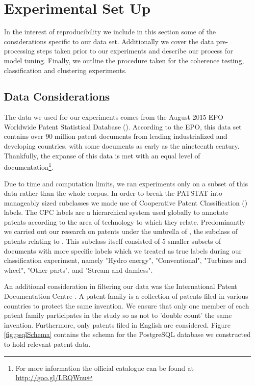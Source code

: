 
\chapter{Experimental Set Up} %

\label{Chapter3} %
In the interest of reproducibility we include in this section some of the considerations specific to our data set. Additionally we cover the data pre-processing steps taken prior to our experiments and describe our process for model tuning. Finally, we outline the procedure taken for the coherence testing, classification and clustering experiments. 

\section{Data Considerations}

The data we used for our experiments comes from the August 2015 EPO Worldwide Patent Statistical Database (). According to the EPO, this data set contains over 90 million patent documents from leading industrialized and developing countries, with some documents as early as the nineteenth century. Thankfully, the expanse of this data is met with an equal level of documentation\footnote{For more information the official catalogue can be found at \url{http://goo.gl/LRQWnu}}. 


Due to time and computation limits, we ran experiments only on a subset of this data rather than the whole corpus. In order to break the PATSTAT into manageably sized subclasses we made use of Cooperative Patent Classification () labels. The CPC labels are a hierarchical system used globally to annotate patents according to the area of technology to which they relate. Predominantly we carried out our research on patents under the umbrella of , the subclass of patents relating to . This subclass itself consisted of 5 smaller subsets of documents with more specific labels which we treated as true labels during our classification experiment, namely "Hydro energy", "Conventional", "Turbines and wheel", "Other parts", and "Stream and damless".

An additional consideration in filtering our data was the International Patent Documentation Centre . A patent family is a collection of patents filed in various countries to protect the same invention. We ensure that only one member of each patent family participates in the study so as not to 'double count' the same invention. Furthermore, only patents filed in English are considered. Figure \ref{fig:psqlSchema} contains the schema for the PostgreSQL database we constructed to hold relevant patent data.


